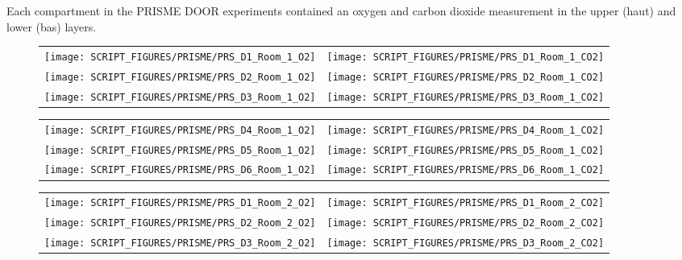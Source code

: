 \clearpage

Each compartment in the PRISME DOOR experiments contained an oxygen and carbon dioxide measurement in the upper (haut) and lower (bas) layers.

\begin{figure}[!ht]
\begin{tabular*}{\textwidth}{l@{\extracolsep{\fill}}r}
\texttt{[image: SCRIPT\_FIGURES/PRISME/PRS\_D1\_Room\_1\_O2]} &
\texttt{[image: SCRIPT\_FIGURES/PRISME/PRS\_D1\_Room\_1\_CO2]} \\
\texttt{[image: SCRIPT\_FIGURES/PRISME/PRS\_D2\_Room\_1\_O2]} &
\texttt{[image: SCRIPT\_FIGURES/PRISME/PRS\_D2\_Room\_1\_CO2]} \\
\texttt{[image: SCRIPT\_FIGURES/PRISME/PRS\_D3\_Room\_1\_O2]} &
\texttt{[image: SCRIPT\_FIGURES/PRISME/PRS\_D3\_Room\_1\_CO2]}
\end{tabular*}
\label{PRISME_Gas_1}
\end{figure}

\begin{figure}[p]
\begin{tabular*}{\textwidth}{l@{\extracolsep{\fill}}r}
\texttt{[image: SCRIPT\_FIGURES/PRISME/PRS\_D4\_Room\_1\_O2]} &
\texttt{[image: SCRIPT\_FIGURES/PRISME/PRS\_D4\_Room\_1\_CO2]} \\
\texttt{[image: SCRIPT\_FIGURES/PRISME/PRS\_D5\_Room\_1\_O2]} &
\texttt{[image: SCRIPT\_FIGURES/PRISME/PRS\_D5\_Room\_1\_CO2]} \\
\texttt{[image: SCRIPT\_FIGURES/PRISME/PRS\_D6\_Room\_1\_O2]} &
\texttt{[image: SCRIPT\_FIGURES/PRISME/PRS\_D6\_Room\_1\_CO2]}
\end{tabular*}
\label{PRISME_Gas_2}
\end{figure}

\begin{figure}[p]
\begin{tabular*}{\textwidth}{l@{\extracolsep{\fill}}r}
\texttt{[image: SCRIPT\_FIGURES/PRISME/PRS\_D1\_Room\_2\_O2]} &
\texttt{[image: SCRIPT\_FIGURES/PRISME/PRS\_D1\_Room\_2\_CO2]} \\
\texttt{[image: SCRIPT\_FIGURES/PRISME/PRS\_D2\_Room\_2\_O2]} &
\texttt{[image: SCRIPT\_FIGURES/PRISME/PRS\_D2\_Room\_2\_CO2]} \\
\texttt{[image: SCRIPT\_FIGURES/PRISME/PRS\_D3\_Room\_2\_O2]} &
\texttt{[image: SCRIPT\_FIGURES/PRISME/PRS\_D3\_Room\_2\_CO2]}
\end{tabular*}
\label{PRISME_Gas_3}
\end{figure}

